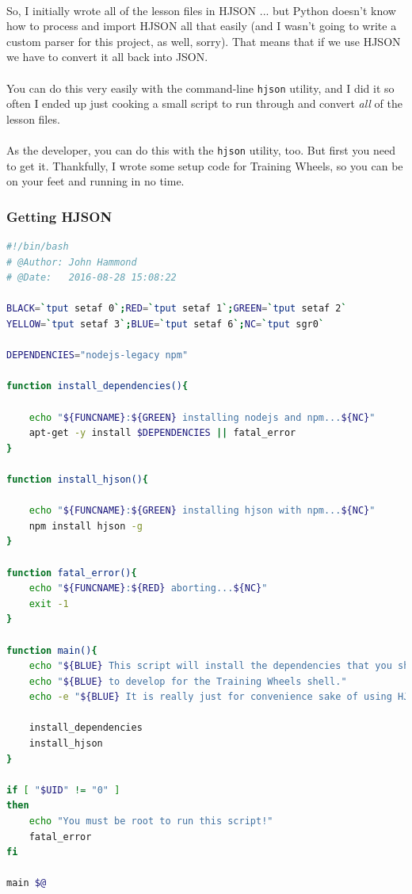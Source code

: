 \documentclass[11pt]{article}
\begin{document}
	\paragraph{} So, I initially wrote all of the lesson files in HJSON ... but Python doesn't know how to process and import HJSON all that easily (and I wasn't going to write a custom parser for this project, as well, sorry). That means that if we use HJSON we have to convert it all back into JSON.

	\paragraph{} You can do this very easily with the command-line \texttt{hjson} utility, and I did it so often I ended up just cooking a small script to run through and convert \textit{all} of the lesson files.

	\paragraph{} As the developer, you can do this with the \texttt{hjson} utility, too. But first you need to get it. Thankfully, I wrote some setup code for Training Wheels, so you can be on your feet and running in no time.

	\subsubsection{Getting HJSON} 

	\begin{lstlisting}[language=Bash]
#!/bin/bash
# @Author: John Hammond
# @Date:   2016-08-28 15:08:22

BLACK=`tput setaf 0`;RED=`tput setaf 1`;GREEN=`tput setaf 2`
YELLOW=`tput setaf 3`;BLUE=`tput setaf 6`;NC=`tput sgr0`

DEPENDENCIES="nodejs-legacy npm"

function install_dependencies(){

	echo "${FUNCNAME}:${GREEN} installing nodejs and npm...${NC}"
	apt-get -y install $DEPENDENCIES || fatal_error
}

function install_hjson(){

	echo "${FUNCNAME}:${GREEN} installing hjson with npm...${NC}"
	npm install hjson -g
}

function fatal_error(){
	echo "${FUNCNAME}:${RED} aborting...${NC}"
	exit -1
}

function main(){
	echo "${BLUE} This script will install the dependencies that you should have"
	echo "${BLUE} to develop for the Training Wheels shell."
	echo -e "${BLUE} It is really just for convenience sake of using HJSON.\n ${NC}"

	install_dependencies
	install_hjson
}

if [ "$UID" != "0" ]
then
	echo "You must be root to run this script!"
	fatal_error
fi

main $@
	\end{lstlisting}
\end{document}
